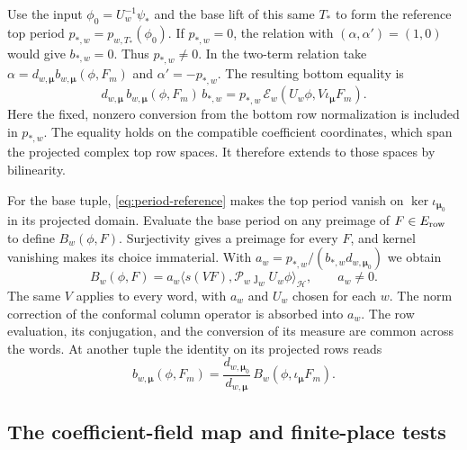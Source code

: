 Use the input \(\phi_0=U_w^{-1}\psi_*\) and the base lift of this
same \(T_*\) to form the reference top period \(p_{*,w}=p_{w,T_*}(\phi_0)\).
If \(p_{*,w}=0\), the relation with \((\alpha,\alpha')=(1,0)\) would
give \(b_{*,w}=0\). Thus \(p_{*,w}\ne0\). In the two-term relation take
\(\alpha=d_{w,\boldsymbol\mu}b_{w,\boldsymbol\mu}(\phi,F_m)\)
and \(\alpha'=-p_{*,w}\). The resulting bottom equality is
\begin{equation}
\label{eq:period-reference}
 d_{w,\boldsymbol\mu}\,b_{w,\boldsymbol\mu}(\phi,F_m)\,b_{*,w}
 =p_{*,w}\,\mathcal E_w(U_w\phi,V\iota_{\boldsymbol\mu}F_m).
\end{equation}
Here the fixed, nonzero conversion from the bottom row normalization
is included in \(p_{*,w}\). The equality holds on the compatible
coefficient coordinates, which span the projected complex top row
spaces. It therefore extends to those spaces by bilinearity.

For the base tuple, \eqref{eq:period-reference} makes the top period
vanish on \(\ker\iota_{\boldsymbol\mu_0}\) in its projected domain.
Evaluate the base period on any preimage of \(F\in E_{\rm row}\)
to define \(B_w(\phi,F)\). Surjectivity gives a preimage for every
\(F\), and kernel vanishing makes its choice immaterial. With
\(a_w=p_{*,w}/(b_{*,w}d_{w,\boldsymbol\mu_0})\)
we obtain
\begin{equation}
\label{eq:period-bessel}
 B_w(\phi,F)
   = a_w\big\langle s(VF),\mathcal P_w\jmath_wU_w\phi
          \big\rangle_{\mathcal H},\qquad a_w\ne0 .
\end{equation}
The same \(V\) applies to every word, with \(a_w\) and \(U_w\) chosen
for each \(w\). The norm correction of the conformal column operator
is absorbed into \(a_w\). The row evaluation, its conjugation, and
the conversion of its measure are common across the words.
At another tuple the identity on its projected
rows reads
\begin{equation}
\label{eq:period-tuple}
 b_{w,\boldsymbol\mu}(\phi,F_m)
 =\frac{d_{w,\boldsymbol\mu_0}}{d_{w,\boldsymbol\mu}}\,
     B_w(\phi,\iota_{\boldsymbol\mu}F_m).
\end{equation}

\subsection{The coefficient-field map and finite-place tests}

%
